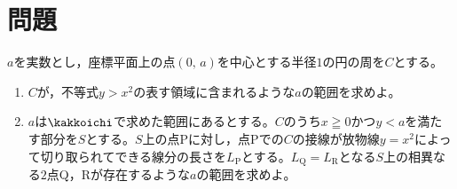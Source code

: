 \documentclass[../../../doc/main]{subfiles}
\begin{document}
    \setcounter{chapter}{3}
    \setcounter{section}{1}
    \section{問題}\label{問題3}
        \begin{tcolorbox}
            $a$を実数とし，座標平面上の点$(0,\,a)$を中心とする半径$1$の円の周を$C$とする。
            \begin{enumerate}
                \item [\kakkoichi] 
                    $C$が，不等式$y>x^2$の表す領域に含まれるような$a$の範囲を求めよ。
                \item [\kakkoni] 
                    $a$は$\kakkoichi$で求めた範囲にあるとする。$C$のうち$x\geqq0$かつ$y<a$を満たす部分を$S$とする。$S$上の点Pに対し，点Pでの$C$の接線が放物線$y=x^2$によって切り取られてできる線分の長さを$L_{\text{P}}$とする。$L_{\text{Q}}=L_{\text{R}}$となる$S$上の相異なる$2$点Q，Rが存在するような$a$の範囲を求めよ。
            \end{enumerate}
        \end{tcolorbox}
\end{document}
